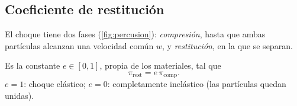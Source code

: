 \subsection{Coeficiente de restitución}

El choque tiene dos fases (\cref{fig:percusion}): \emph{compresión}, hasta que ambas
partículas alcanzan una velocidad común $w$, y \emph{restitución}, en la que se separan.

\begin{definicion}
\label{def:e}
Es la constante $e\in[0,1]$, propia de los materiales, tal que
\begin{equation}
  \pi_{\mathrm{rest}}=e\,\pi_{\mathrm{comp}} .
\end{equation}
$e=1$: choque elástico; $e=0$: completamente inelástico (las partículas quedan unidas).
\end{definicion}


